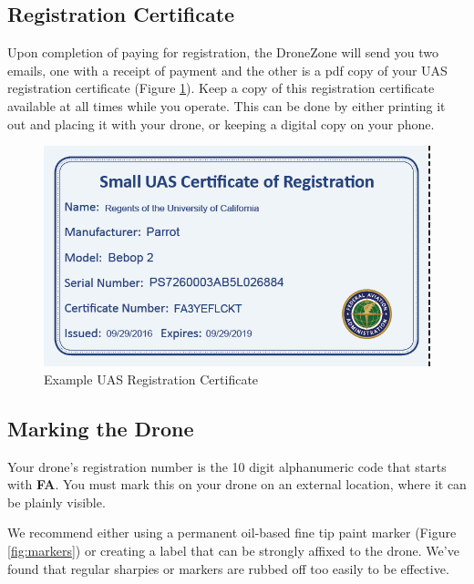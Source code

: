 \documentclass[
  12pt,
]{book}
\begin{document}
\subsection{Registration Certificate}\label{registration-certificate}

Upon completion of paying for registration, the DroneZone will send you two emails, one with a receipt of payment and the other is a pdf copy of your UAS registration certificate (Figure \ref{fig:reg-cert}). Keep a copy of this registration certificate available at all times while you operate. This can be done by either printing it out and placing it with your drone, or keeping a digital copy on your phone.

\begin{figure}

{\centering \includegraphics[width=0.5\linewidth]{images/reg_cert} 

}

\caption{Example UAS Registration Certificate}\label{fig:reg-cert}
\end{figure}

\subsection{Marking the Drone}\label{marking-the-drone}

Your drone's registration number is the 10 digit alphanumeric code that starts with \textbf{FA}. You must mark this on your drone on an external location, where it can be plainly visible.

We recommend either using a permanent oil-based fine tip paint marker (Figure \ref{fig:markers}) or creating a label that can be strongly affixed to the drone. We've found that regular sharpies or markers are rubbed off too easily to be effective.
\end{document}
